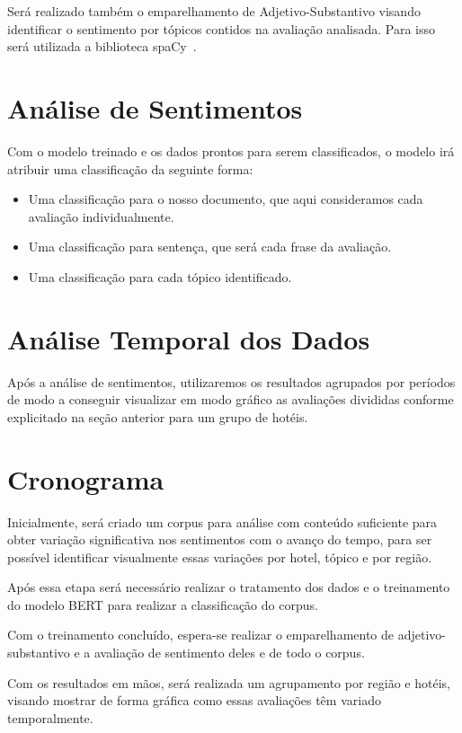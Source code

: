 Será realizado também o emparelhamento de Adjetivo-Substantivo visando identificar o sentimento por tópicos contidos na avaliação analisada. Para isso será utilizada a biblioteca spaCy~\cite{montani2022spacy}. 

\section{Análise de Sentimentos}

Com o modelo treinado e os dados prontos para serem classificados, o modelo irá atribuir uma classificação da seguinte forma:
\begin{itemize}
    \item Uma classificação para o nosso documento, que aqui consideramos cada avaliação individualmente.
    \item Uma classificação para sentença, que será cada frase da  avaliação.
    \item Uma classificação para cada tópico identificado.
\end{itemize}

\section{Análise Temporal dos Dados}

Após a análise de sentimentos, utilizaremos os resultados agrupados por períodos de modo a conseguir visualizar em modo gráfico as avaliações divididas conforme explicitado na seção anterior para um grupo de hotéis.  

\section{Cronograma}

Inicialmente, será criado um corpus para análise com conteúdo suficiente para obter variação significativa nos sentimentos com o avanço do tempo, para ser possível identificar visualmente essas variações por hotel, tópico e por região.

Após essa etapa será necessário realizar o tratamento dos dados e o treinamento do modelo BERT para realizar a classificação do corpus.

Com o treinamento concluído, espera-se realizar o emparelhamento de adjetivo-substantivo e a avaliação de sentimento deles e de todo o corpus.

Com os resultados em mãos, será realizada um agrupamento por região e hotéis, visando mostrar de forma gráfica como essas avaliações têm variado temporalmente.

